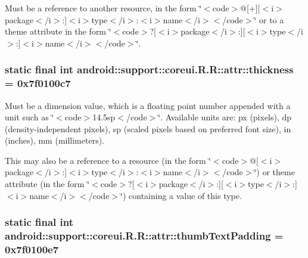 Must be a reference to another resource, in the form \char`\"{}$<$code$>$@\mbox{[}+\mbox{]}\mbox{[}$<$i$>$package$<$/i$>$:\mbox{]}$<$i$>$type$<$/i$>$:$<$i$>$name$<$/i$>$$<$/code$>$\char`\"{} or to a theme attribute in the form \char`\"{}$<$code$>$?\mbox{[}$<$i$>$package$<$/i$>$:\mbox{]}\mbox{[}$<$i$>$type$<$/i$>$:\mbox{]}$<$i$>$name$<$/i$>$$<$/code$>$\char`\"{}. \hypertarget{classandroid_1_1support_1_1coreui_1_1_r_1_1attr_9474d74ff2e2528a7ad24aed951e73f3}{
\subsubsection[{thickness}]{\setlength{\rightskip}{0pt plus 5cm}static final int android::support::coreui.R.R::attr::thickness = 0x7f0100c7}}
\label{classandroid_1_1support_1_1coreui_1_1_r_1_1attr_9474d74ff2e2528a7ad24aed951e73f3}


Must be a dimension value, which is a floating point number appended with a unit such as \char`\"{}$<$code$>$14.5sp$<$/code$>$\char`\"{}. Available units are: px (pixels), dp (density-independent pixels), sp (scaled pixels based on preferred font size), in (inches), mm (millimeters). 

This may also be a reference to a resource (in the form \char`\"{}$<$code$>$@\mbox{[}$<$i$>$package$<$/i$>$:\mbox{]}$<$i$>$type$<$/i$>$:$<$i$>$name$<$/i$>$$<$/code$>$\char`\"{}) or theme attribute (in the form \char`\"{}$<$code$>$?\mbox{[}$<$i$>$package$<$/i$>$:\mbox{]}\mbox{[}$<$i$>$type$<$/i$>$:\mbox{]}$<$i$>$name$<$/i$>$$<$/code$>$\char`\"{}) containing a value of this type. \hypertarget{classandroid_1_1support_1_1coreui_1_1_r_1_1attr_03b6904667c5c85ff5f1fa9a2598701f}{
\subsubsection[{thumbTextPadding}]{\setlength{\rightskip}{0pt plus 5cm}static final int android::support::coreui.R.R::attr::thumbTextPadding = 0x7f0100e7}}
\label{classandroid_1_1support_1_1coreui_1_1_r_1_1attr_03b6904667c5c85ff5f1fa9a2598701f}


